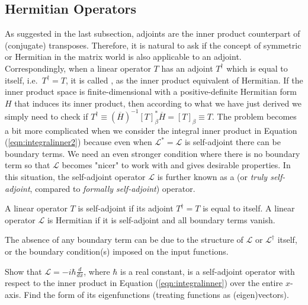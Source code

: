 \subsection{Hermitian Operators}
As suggested in the last subsection, adjoints are the inner product counterpart of (conjugate) transposes. Therefore, it is natural to ask if the concept of symmetric or Hermitian in the matrix world is also applicable to an adjoint. Correspondingly, when a linear operator $T$ has an adjoint $T^\dag$ which is equal to itself, i.e.\ $T^\dag = T$, it is called , as the inner product equivalent of Hermitian. If the inner product space is finite-dimensional with a positive-definite Hermitian form $H$ that induces its inner product, then according to what we have just derived we simply need to check if $T^\dag \equiv (\overline{H})^{-1} [T]_\beta^* \overline{H} = [T]_\beta \equiv T$. The problem becomes a bit more complicated when we consider the integral inner product in Equation (\ref{eqn:integralinner2}) because even when $\mathcal{L}^* = \mathcal{L}$ is self-adjoint there can be boundary terms. We need an even stronger condition where there is no boundary term so that $\mathcal{L}$ becomes "nicer" to work with and gives desirable properties. In this situation, the self-adjoint operator $\mathcal{L}$ is further known as a  (or \textit{truly self-adjoint}, compared to \textit{formally self-adjoint}) operator.
\begin{defn}
\label{defn:selfadjoint}
A linear operator $T$ is self-adjoint if its adjoint $T^\dag = T$ is equal to itself. A linear operator $\mathcal{L}$ is Hermitian if it is self-adjoint and all boundary terms vanish.
\end{defn}
The absence of any boundary term can be due to the structure of $\mathcal{L}$ or $\mathcal{L}^\dag$ itself, or the boundary condition(s) imposed on the input functions. 
\begin{exmp}
Show that $\mathcal{L} = -i \hbar\frac{d}{dx}$, where $\hbar$ is a real constant, is a self-adjoint operator with respect to the inner product in Equation (\ref{eqn:integralinner}) over the entire $x$-axis. Find the form of its eigenfunctions (treating functions as (eigen)vectors).
\end{exmp}
